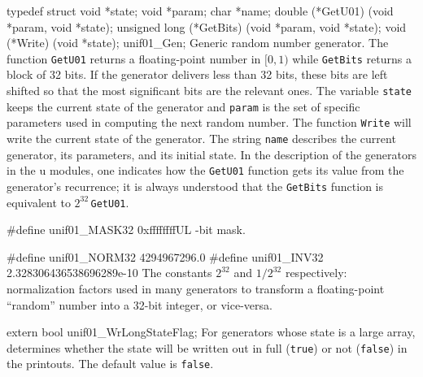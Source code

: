 \code

typedef struct {
   void *state;
   void *param;
   char *name;
   double (*GetU01) (void *param, void *state);
   unsigned long (*GetBits) (void *param, void *state);
   void (*Write) (void *state);
} unif01_Gen;
\endcode
  \tab Generic random number generator. The function {\tt GetU01}
   returns a floating-point number in $[0,1)$ while {\tt GetBits}
   returns a block of 32 bits. If the generator delivers less than 32
   bits, these bits are left shifted so that the most
   significant bits are the relevant ones.
   The variable {\tt state} keeps the
   current state of the generator and {\tt param} is the set of
   specific parameters used in computing the next random number.
   The function  {\tt Write} will write the current state of the
   generator. The string  {\tt name}  describes the current generator,
   its parameters, and its initial state.
   In the description of the generators in the u modules, one
   indicates how the {\tt GetU01} function  gets its value from the
   generator's recurrence;
   it is always understood that the {\tt GetBits}  function is
   equivalent to $2^{32}\,${\tt GetU01}.
  \endtab


\ifdetailed
\code

#define unif01_MASK32  0xffffffffUL
\endcode
  -bit mask.
 \endtab
\code


#define unif01_NORM32  4294967296.0
#define unif01_INV32   2.328306436538696289e-10
\endcode
 \tab The constants $2^{32}$ and $1/2^{32}$ respectively:
   normalization factors used in many generators to transform
  a floating-point ``random'' number into a 32-bit integer, or vice-versa.
 \endtab
\fi

\code


extern bool unif01_WrLongStateFlag;
\endcode
  \tab For generators whose state is a large array, determines whether
   the state will be written out in full ({\tt true}) or not ({\tt false})
   in the printouts. The default value is {\tt false}.
 \endtab



